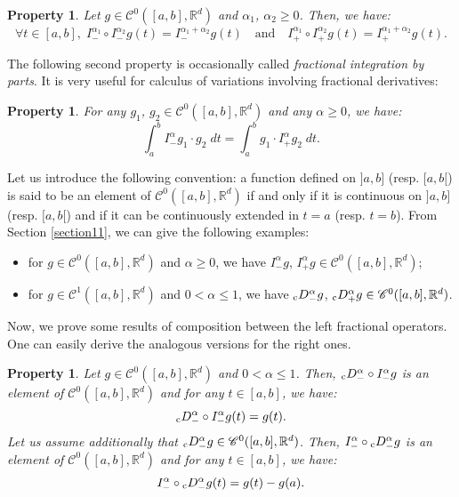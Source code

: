 \documentclass[english,11pt,reqno]{smfart}
\newtheorem{property}[theorem]{Property}
\def\di{\displaystyle}
\newcommand{\R}{\mathbb{R}}
\newcommand{\CC}{\mathscr{C}}
\newcommand{\cDM}{{}_{{\rm c}} D^\alpha_-}
\newcommand{\cDP}{{}_{{\rm c}} D^\alpha_+}
\begin{document}
\begin{property}\label{prop1}
Let $g \in \CC^0 ([a,b],\R^d)$ and $\alpha_1$, $\alpha_2 \geq 0$. Then, we have:
\begin{equation}
\forall t \in [a,b], \; I^{\alpha_1}_- \circ I^{\alpha_2}_- g (t) = I^{\alpha_1 + \alpha_2}_- g(t) \quad \text{and} \quad I^{\alpha_1}_+ \circ I^{\alpha_2}_+ g (t) = I^{\alpha_1 + \alpha_2}_+ g(t).
\end{equation}
\end{property}

The following second property is occasionally called \textit{fractional integration by parts}. It is very useful for calculus of variations involving fractional derivatives:

\begin{property}\label{prop2}
For any $g_1$, $g_2 \in \CC^0 ([a,b],\R^d)$ and any $\alpha \geq 0$, we have:
\begin{equation}
\di \int_a^b I^\alpha_- g_1 \cdot g_2 \; dt = \di \int_a^b  g_1 \cdot I^\alpha_+ g_2 \; dt.
\end{equation}
\end{property}

Let us introduce the following convention: a function defined on $]a,b]$ (resp. $[a,b[$) is said to be an element of $\CC^0 ([a,b],\R^d)$ if and only if it is continuous on $]a,b]$ (resp. $[a,b[$) and if it can be continuously extended in $t=a$ (resp. $t=b$). From Section \ref{section11}, we can give the following examples:
\begin{itemize}
\item for $g \in \CC^0 ([a,b],\R^d)$ and $\alpha \geq 0$, we have $I^\alpha_- g$, $I^\alpha_+ g \in \CC^0 ([a,b],\R^d)$;
\item for $g \in \CC^1 ([a,b],\R^d)$ and $0 < \alpha \leq 1$, we have $\cDM g$, $\cDP g \in \CC^0 ([a,b],\R^d)$.
\end{itemize}
Now, we prove some results of composition between the left fractional operators. One can easily derive the analogous versions for the right ones. 

\begin{property}\label{prop3}
Let $g \in \CC^0 ([a,b],\R^d)$ and $0 < \alpha \leq 1$. Then, $\cDM \circ I^\alpha_- g $ is an element of $\CC^0 ([a,b],\R^d)$ and for any $t \in [a,b] $, we have:
\begin{equation}
\cDM \circ I^\alpha_- g(t) = g(t).
\end{equation}
Let us assume additionally that $\cDM g \in \CC^0 ([a,b],\R^d)$. Then, $ I^\alpha_- \circ \cDM g $ is an element of $\CC^0 ([a,b],\R^d)$ and for any $t \in [a,b]$, we have:
\begin{equation}
I^\alpha_- \circ \cDM g (t) = g(t)-g(a).
\end{equation}
\end{property}
\end{document}
